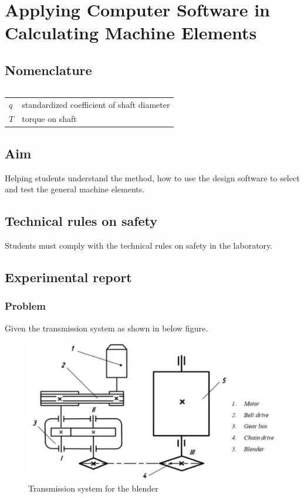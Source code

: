 \chapter{Applying Computer Software in Calculating Machine Elements}
\section{Nomenclature}
\begin{tabular}[t]{lp{7cm}}
		
\end{tabular}
\begin{tabular}[t]{lp{7cm}}
	$ q $ & standardized coefficient of shaft diameter\\
	$ T $ & torque on shaft
\end{tabular}
\section{Aim}
Helping students understand the method, how to use the design software to select and test the general machine elements.
\section{Technical rules on safety}
Students must comply with the technical rules on safety in the laboratory.
\section{Experimental report}
\subsection{Problem}
Given the transmission system as shown in below figure.
\begin{figure}[ht]
	\centering
	\includegraphics[width=150mm]{system.png}
	\caption{Transmission system for the blender}
	\label{blender}
\end{figure}


